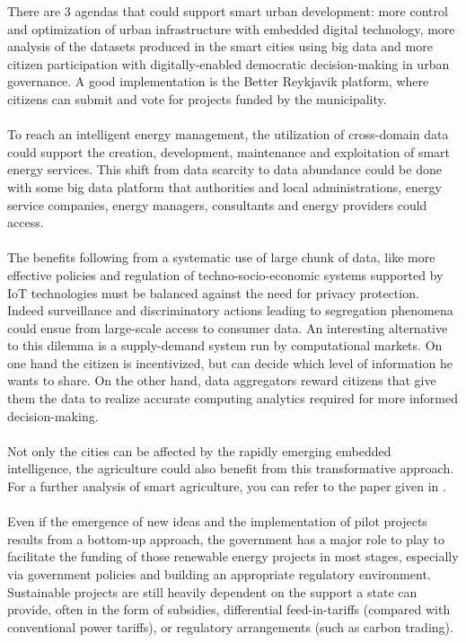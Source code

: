 \documentclass[11pt]{article}
\begin{document}
There are 3 agendas that could support smart urban development: more control and optimization of urban infrastructure with embedded digital technology, more analysis of the datasets produced in the smart cities using big data and more citizen participation with digitally-enabled democratic decision-making in urban governance. A good implementation is the Better Reykjavik platform, where citizens can submit and vote for projects funded by the municipality.\cite{17}\\\\
To reach an intelligent energy management, the utilization of cross-domain data could support the creation, development, maintenance and exploitation of smart energy services. This shift from data scarcity to data abundance could be done with some big data platform that authorities and local administrations, energy service companies, energy managers, consultants and energy providers could access.\cite{18}\cite{19}\\\\
The benefits following from a systematic use of large chunk of data, like more effective policies and regulation of techno-socio-economic systems supported by IoT technologies must be balanced against the need for privacy protection. Indeed surveillance and discriminatory actions leading to segregation phenomena could ensue from large-scale access to consumer data. An interesting alternative to this dilemma is a supply-demand system run by computational markets. On one hand the citizen is incentivized, but can decide which level of information he wants to share. On the other hand, data aggregators reward citizens that give them the data to realize accurate computing analytics required for more informed decision-making.\cite{20}\\\\
Not only the cities can be affected by the rapidly emerging embedded intelligence, the agriculture could also benefit from this transformative approach. For a further analysis of smart agriculture, you can refer to the paper given in \cite{21}.\\\\
Even if the emergence of new ideas and the implementation of pilot projects results from a bottom-up approach, the government has a major role to play to facilitate the funding of those renewable energy projects in most stages, especially via government policies and building an appropriate regulatory environment. Sustainable projects are still heavily dependent on the support a state can provide, often in the form of subsidies, differential feed-in-tariffs (compared with conventional power tariffs), or regulatory arrangements (such as carbon trading).\cite{22}\\
\end{document}
